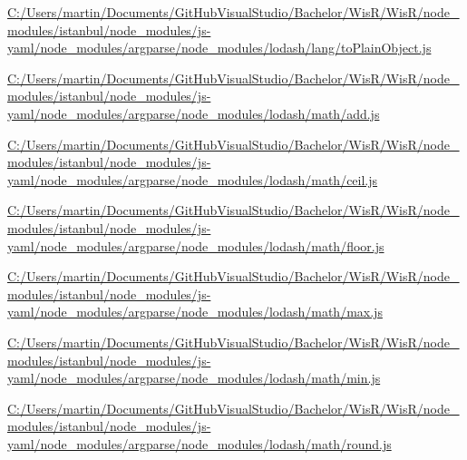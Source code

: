 \begin{DoxyCompactItemize}
\item 
\hyperlink{_c_1_2_users_2martin_2_documents_2_git_hub_visual_studio_2_bachelor_2_wis_r_2_wis_r_2node_modulee0df8010fa822c862753ec364e7809e3}{C\+:/\+Users/martin/\+Documents/\+Git\+Hub\+Visual\+Studio/\+Bachelor/\+Wis\+R/\+Wis\+R/node\+\_\+modules/istanbul/node\+\_\+modules/js-\/yaml/node\+\_\+modules/argparse/node\+\_\+modules/lodash/lang/to\+Plain\+Object.\+js}
\item 
\hyperlink{_c_1_2_users_2martin_2_documents_2_git_hub_visual_studio_2_bachelor_2_wis_r_2_wis_r_2node_modulee8438e3fcf13464e31691346fce854f1}{C\+:/\+Users/martin/\+Documents/\+Git\+Hub\+Visual\+Studio/\+Bachelor/\+Wis\+R/\+Wis\+R/node\+\_\+modules/istanbul/node\+\_\+modules/js-\/yaml/node\+\_\+modules/argparse/node\+\_\+modules/lodash/math/add.\+js}
\item 
\hyperlink{_c_1_2_users_2martin_2_documents_2_git_hub_visual_studio_2_bachelor_2_wis_r_2_wis_r_2node_module7f746c31aaf301e1ba0012ba43754df0}{C\+:/\+Users/martin/\+Documents/\+Git\+Hub\+Visual\+Studio/\+Bachelor/\+Wis\+R/\+Wis\+R/node\+\_\+modules/istanbul/node\+\_\+modules/js-\/yaml/node\+\_\+modules/argparse/node\+\_\+modules/lodash/math/ceil.\+js}
\item 
\hyperlink{_c_1_2_users_2martin_2_documents_2_git_hub_visual_studio_2_bachelor_2_wis_r_2_wis_r_2node_module9b5427d984ef970e4a0ea91672ed848b}{C\+:/\+Users/martin/\+Documents/\+Git\+Hub\+Visual\+Studio/\+Bachelor/\+Wis\+R/\+Wis\+R/node\+\_\+modules/istanbul/node\+\_\+modules/js-\/yaml/node\+\_\+modules/argparse/node\+\_\+modules/lodash/math/floor.\+js}
\item 
\hyperlink{_c_1_2_users_2martin_2_documents_2_git_hub_visual_studio_2_bachelor_2_wis_r_2_wis_r_2node_module10fe477b364474bbb1da97cb7ca019d8}{C\+:/\+Users/martin/\+Documents/\+Git\+Hub\+Visual\+Studio/\+Bachelor/\+Wis\+R/\+Wis\+R/node\+\_\+modules/istanbul/node\+\_\+modules/js-\/yaml/node\+\_\+modules/argparse/node\+\_\+modules/lodash/math/max.\+js}
\item 
\hyperlink{_c_1_2_users_2martin_2_documents_2_git_hub_visual_studio_2_bachelor_2_wis_r_2_wis_r_2node_modulefffc88e5638ffa4805a7370f54cd9125}{C\+:/\+Users/martin/\+Documents/\+Git\+Hub\+Visual\+Studio/\+Bachelor/\+Wis\+R/\+Wis\+R/node\+\_\+modules/istanbul/node\+\_\+modules/js-\/yaml/node\+\_\+modules/argparse/node\+\_\+modules/lodash/math/min.\+js}
\item 
\hyperlink{_c_1_2_users_2martin_2_documents_2_git_hub_visual_studio_2_bachelor_2_wis_r_2_wis_r_2node_moduleb21f20224753b287ce9892c77374285e}{C\+:/\+Users/martin/\+Documents/\+Git\+Hub\+Visual\+Studio/\+Bachelor/\+Wis\+R/\+Wis\+R/node\+\_\+modules/istanbul/node\+\_\+modules/js-\/yaml/node\+\_\+modules/argparse/node\+\_\+modules/lodash/math/round.\+js}

\end{DoxyCompactItemize}
